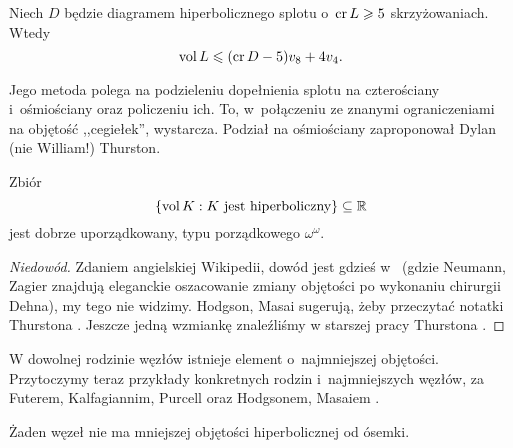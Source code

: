 \begin{proposition}
    Niech $D$ będzie diagramem hiperbolicznego splotu o~$\operatorname{cr} L \geqslant 5$ skrzyżowaniach.
    Wtedy
    \begin{equation}
        \operatorname{vol} L \leqslant (\operatorname{cr} D - 5) v_8 + 4v_4.
    \end{equation}
\end{proposition}

Jego metoda polega na podzieleniu dopełnienia splotu na czterościany i~ośmiościany oraz policzeniu ich.
To, w~połączeniu ze znanymi ograniczeniami na objętość ,,cegiełek'', wystarcza.
Podział na ośmiościany zaproponował Dylan (nie William!) Thurston.
%

\begin{proposition}
    Zbiór
    \begin{equation}
        \{\operatorname{vol} K: K \textrm{ jest hiperboliczny}\} \subseteq \mathbb R
    \end{equation}
    jest dobrze uporządkowany, typu porządkowego $\omega^\omega$.
\end{proposition}

\begin{proof}[Niedowód]
    Zdaniem angielskiej Wikipedii, dowód jest gdzieś w~\cite{neumann1985} (gdzie Neumann, Zagier znajdują eleganckie oszacowanie zmiany objętości po wykonaniu chirurgii Dehna), my tego nie widzimy.
%
%
    Hodgson, Masai \cite{hodgson2013} sugerują, żeby przeczytać notatki Thurstona \cite{thurston2002}.
%
%
    Jeszcze jedną wzmiankę znaleźliśmy w starszej pracy Thurstona \cite[s. 365]{thurston1982}.
\end{proof}

W dowolnej rodzinie węzłów istnieje element o~najmniejszej objętości.
Przytoczymy teraz przykłady konkretnych rodzin i~najmniejszych węzłów, za Futerem, Kalfagiannim, Purcell \cite[s. 16-17]{purcell2019} oraz Hodgsonem, Masaiem \cite[s. 296]{hodgson2013}.
%
%
%
%
%

\begin{proposition}
%
%
\label{prp:eight_smallest_volume}%
    Żaden węzeł nie ma mniejszej objętości hiperbolicznej od ósemki.
\end{proposition}

